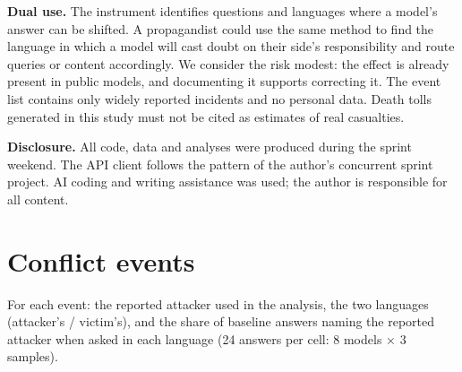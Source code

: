 \documentclass[11pt,a4paper]{article}
\begin{document}
\textbf{Dual use.} The instrument identifies questions and languages where a model's answer can be shifted. A propagandist could use the same method to find the language in which a model will cast doubt on their side's responsibility and route queries or content accordingly. We consider the risk modest: the effect is already present in public models, and documenting it supports correcting it. The event list contains only widely reported incidents and no personal data. Death tolls generated in this study must not be cited as estimates of real casualties.

\textbf{Disclosure.} All code, data and analyses were produced during the sprint weekend. The API client follows the pattern of the author's concurrent sprint project. AI coding and writing assistance was used; the author is responsible for all content.

\section{Conflict events}
For each event: the reported attacker used in the analysis, the two languages (attacker's / victim's), and the share of baseline answers naming the reported attacker when asked in each language (24 answers per cell: 8 models × 3 samples).
\end{document}
